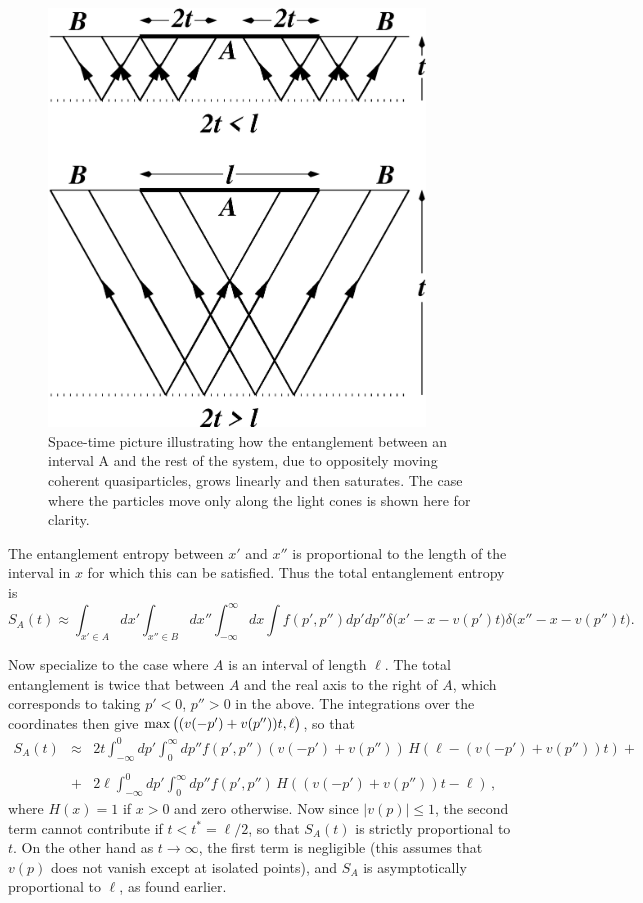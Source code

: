 \documentclass[12pt,preprint,tighten,eqsecnum,aps,floats,psfig,epsfig,amsmath,onecolumn]{revtex4-1}
\def\be{\begin{equation}}
\def\ee{\end{equation}}
\def\bea{\begin{eqnarray}}
\def\eea{\end{eqnarray}}
\begin{document}
\begin{figure}[t]
\centering
\includegraphics[width=10cm]{2tl.eps}
\caption{\label{fig2tl}
Space-time picture illustrating how the entanglement between
an interval A and the rest of the system,
due to oppositely moving coherent quasiparticles, grows
linearly and then saturates. The case where the particles move only
along the light cones is shown here for clarity.}
\end{figure}
The entanglement entropy between $x'$ and $x''$
is proportional to the length of the interval
in $x$ for which this can be satisfied. Thus the total entanglement
entropy is
\be
S_A(t)\approx \int_{x'\in A}dx'\int_{x''\in B}dx''\int_{-\infty}^\infty
dx\int
f(p',p'')dp'dp''\delta\big(x'-x-v(p')t\big)\delta\big(x''-x-v(p'')t\big).
\ee

Now specialize to the case where $A$ is an interval of length $\ell$.
The total entanglement is twice that
between $A$ and the real axis to the right of $A$, which corresponds to
taking $p'<0$, $p''>0$ in the above. The integrations over the
coordinates then give ${\rm max}\,\big((v(-p')+v(p''))t,\ell\big)$, so
that
\bea
S_A(t)&\approx& 2t\int_{-\infty}^0dp'\int_0^\infty dp''f(p',p'')
(v(-p')+v(p''))\,H(\ell-(v(-p')+v(p''))t)+
\nonumber\\
\nonumber\\&+&
2\ell \int_{-\infty}^0dp'\int_0^\infty dp''f(p',p'')
\,H((v(-p')+v(p''))t-\ell)\,,
\label{ppp}
\eea
where $H(x)=1$ if $x>0$ and zero otherwise. Now since $|v(p)|\leq 1$,
the second term cannot contribute if $t<t^*=\ell/2$, so that $S_A(t)$ is
strictly proportional to $t$. On the other hand as $t\to\infty$, the
first term is negligible (this assumes that $v(p)$ does not vanish
except at isolated points), and $S_A$ is asymptotically proportional to
$\ell$, as found earlier. 
\end{document}
